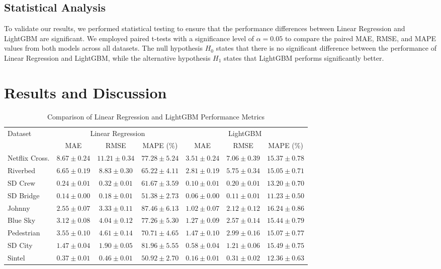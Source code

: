 \documentclass[10pt]{article}
\begin{document}
\subsection{Statistical Analysis}
To validate our results, we performed statistical testing to ensure that the performance differences between Linear Regression and LightGBM are significant. We employed paired t-tests with a significance level of $\alpha = 0.05$ to compare the paired MAE, RMSE, and MAPE values from both models across all datasets. The null hypothesis $H_0$ states that there is no significant difference between the performance of Linear Regression and LightGBM, while the alternative hypothesis $H_1$ states that LightGBM performs significantly better.

\section{Results and Discussion}

\begin{table}[htbp]
\centering
\small
\caption{Comparison of Linear Regression and LightGBM Performance Metrics}
\setlength{\tabcolsep}{4pt}
\begin{tabular}{lcccccc}
\toprule
\multirow{2}{*}{Dataset} & \multicolumn{3}{c}{Linear Regression} & \multicolumn{3}{c}{LightGBM} \\
\cmidrule(lr){2-4} \cmidrule(lr){5-7}
 & MAE & RMSE & MAPE (\%) & MAE & RMSE & MAPE (\%) \\
\midrule
Netflix Cross. & $8.67{\pm}0.24$ & $11.21{\pm}0.34$ & $77.28{\pm}5.24$ & $3.51{\pm}0.24$ & $7.06{\pm}0.39$ & $15.37{\pm}0.78$ \\
Riverbed & $6.65{\pm}0.19$ & $8.83{\pm}0.30$ & $65.22{\pm}4.11$ & $2.81{\pm}0.19$ & $5.75{\pm}0.34$ & $15.05{\pm}0.71$ \\
SD Crew & $0.24{\pm}0.01$ & $0.32{\pm}0.01$ & $61.67{\pm}3.59$ & $0.10{\pm}0.01$ & $0.20{\pm}0.01$ & $13.20{\pm}0.70$ \\
SD Bridge & $0.14{\pm}0.00$ & $0.18{\pm}0.01$ & $51.38{\pm}2.73$ & $0.06{\pm}0.00$ & $0.11{\pm}0.01$ & $11.23{\pm}0.50$ \\
Johnny & $2.55{\pm}0.07$ & $3.33{\pm}0.11$ & $87.46{\pm}6.13$ & $1.02{\pm}0.07$ & $2.12{\pm}0.12$ & $16.24{\pm}0.86$ \\
Blue Sky & $3.12{\pm}0.08$ & $4.04{\pm}0.12$ & $77.26{\pm}5.30$ & $1.27{\pm}0.09$ & $2.57{\pm}0.14$ & $15.44{\pm}0.79$ \\
Pedestrian & $3.55{\pm}0.10$ & $4.61{\pm}0.14$ & $70.71{\pm}4.65$ & $1.47{\pm}0.10$ & $2.99{\pm}0.16$ & $15.07{\pm}0.77$ \\
SD City & $1.47{\pm}0.04$ & $1.90{\pm}0.05$ & $81.96{\pm}5.55$ & $0.58{\pm}0.04$ & $1.21{\pm}0.06$ & $15.49{\pm}0.75$ \\
Sintel & $0.37{\pm}0.01$ & $0.46{\pm}0.01$ & $50.92{\pm}2.70$ & $0.16{\pm}0.01$ & $0.31{\pm}0.02$ & $12.36{\pm}0.63$ \\
\bottomrule
\end{tabular}
\label{tab:model_comparison}
\end{table}
\end{document}
